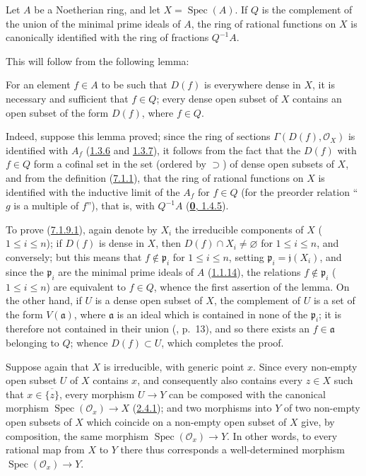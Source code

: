 \begin{corollary}[7.1.9]
\label{I.7.1.9}
Let $A$ be a Noetherian ring, and let $X=\operatorname{Spec}(A)$. If $Q$ is
the complement of the union of the minimal prime ideals of $A$, the ring of
rational functions on $X$ is canonically identified with the ring of
fractions $Q^{-1}A$.
\end{corollary}

This will follow from the following lemma:

\begin{lemma}[7.1.9.1]
\label{I.7.1.9.1}
For an element $f\in A$ to be such that $D(f)$ is everywhere dense in $X$, it
is necessary and sufficient that $f\in Q$; every dense open subset of $X$
contains an open subset of the form $D(f)$, where $f\in Q$.
\end{lemma}

Indeed, suppose this lemma proved; since the ring of sections
$\Gamma(D(f),\mathscr{O}_X)$ is identified with $A_f$
(\hyperref[I.1.3.6]{1.3.6} and \hyperref[I.1.3.7]{1.3.7}), it follows
from the fact that the $D(f)$ with $f\in Q$ form a cofinal set in the set
(ordered by $\supset$) of dense open subsets of $X$, and from the definition
(\hyperref[I.7.1.1]{7.1.1}), that the ring of rational functions on $X$ is
identified with the inductive limit of the $A_f$ for $f\in Q$ (for the
preorder relation ``$g$ is a multiple of $f$''), that is, with $Q^{-1}A$
(\hyperref[0.1.4.5]{\textbf{0}, 1.4.5}).

To prove (\hyperref[I.7.1.9.1]{7.1.9.1}), again denote by $X_i$ the
irreducible components of $X$ ($1\leq i\leq n$); if $D(f)$ is dense in $X$,
then $D(f)\cap X_i\neq\varnothing$ for $1\leq i\leq n$, and conversely; but
this means that $f\notin\mathfrak{p}_i$ for $1\leq i\leq n$, setting
$\mathfrak{p}_i=\mathfrak{j}(X_i)$, and since the $\mathfrak{p}_i$ are the
minimal prime ideals of $A$ (\hyperref[I.1.1.14]{1.1.14}), the relations
$f\notin\mathfrak{p}_i$ ($1\leq i\leq n$) are equivalent to $f\in Q$, whence
the first assertion of the lemma. On the other hand, if $U$ is a dense open
subset of $X$, the complement of $U$ is a set of the form $V(\mathfrak{a})$,
where $\mathfrak{a}$ is an ideal which is contained in none of the
$\mathfrak{p}_i$; it is therefore not contained in their union (\cite{I-10},
p.~13), and so there exists an $f\in\mathfrak{a}$ belonging to $Q$; whence
$D(f)\subset U$, which completes the proof.

\begin{env}[7.1.10]
\label{I.7.1.10}
Suppose again that $X$ is irreducible, with generic point $x$. Since every
non-empty open subset $U$ of $X$ contains $x$, and consequently also contains
every $z\in X$ such that $x\in\overline{\{z\}}$, every morphism $U\to Y$ can
be composed with the canonical morphism $\operatorname{Spec}(\mathscr{O}_x)\to X$
(\hyperref[I.2.4.1]{2.4.1}); and two morphisms into $Y$ of two non-empty
open subsets of $X$ which coincide on a non-empty open subset of $X$ give, by
composition, the same morphism $\operatorname{Spec}(\mathscr{O}_x)\to Y$. In
other words, to every rational map from $X$ to $Y$ there thus corresponds a
well-determined morphism $\operatorname{Spec}(\mathscr{O}_x)\to Y$.
\end{env}

